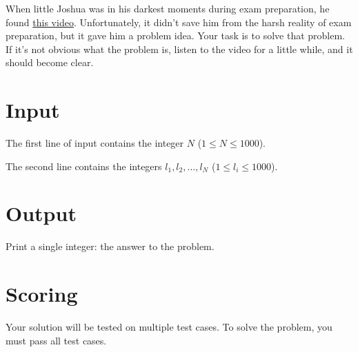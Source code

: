 \noindent
When little Joshua was in his darkest moments during exam preparation, he found
\href{https://www.youtube.com/watch?v=1xtFp2Wu_To}{this video}. Unfortunately, it didn't save him
from the harsh reality of exam preparation, but it gave him a problem idea. Your task
is to solve that problem. If it's not obvious what the problem is, listen to the video for a little
while, and it should become clear.

\section*{Input}
\noindent
The first line of input contains the integer $N$ ($1 \leq N \leq 1000$).

The second line contains the integers $l_1, l_2, \dots, l_N$ ($1 \leq l_i \leq 1000$).

\section*{Output}
\noindent
Print a single integer: the answer to the problem.

\section*{Scoring}
Your solution will be tested on multiple test cases.
\noindent
To solve the problem, you must pass all test cases.